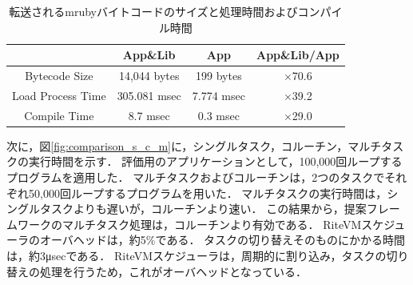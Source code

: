 \documentclass[submit,techrep]{ipsj}
\begin{document}

\begin{table}[t]
    \centering
    \caption{転送されるmrubyバイトコードのサイズと処理時間およびコンパイル時間}
    \begin{tabular}{c||c|c|c}
                            & App\&Lib     & App        &   App\&Lib/App  \\ \hline
          Bytecode Size     & 14,044 bytes & 199 bytes  &   $\times$70.6          \\ %
          Load Process Time & 305.081 msec & 7.774 msec &   $\times$39.2          \\
          Compile Time      & 8.7 msec     & 0.3 msec   &   $\times$29.0          \\
    \end{tabular}
    \label{tab:size_and_time}
\end{table}

次に，図\ref{fig:comparison_s_c_m}に，シングルタスク，コルーチン，マルチタスクの実行時間を示す．
評価用のアプリケーションとして，100,000回ループするプログラムを適用した．
マルチタスクおよびコルーチンは，2つのタスクでそれぞれ50,000回ループするプログラムを用いた．
マルチタスクの実行時間は，シングルタスクよりも遅いが，コルーチンより速い．
この結果から，提案フレームワークのマルチタスク処理は，コルーチンより有効である．
RiteVMスケジューラのオーバヘッドは，約5\%である．
タスクの切り替えそのものにかかる時間は，約3μsecである．
RiteVMスケジューラは，周期的に割り込み，タスクの切り替えの処理を行うため，これがオーバヘッドとなっている．
\end{document}
